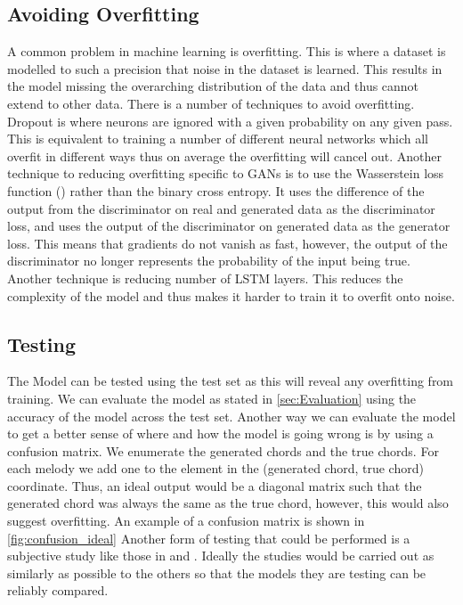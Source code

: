 \subsection{Avoiding Overfitting}
A common problem in machine learning is overfitting. This is where a dataset is modelled to such a precision that noise in the dataset is learned.
This results in the model missing the overarching distribution of the data and thus cannot extend to other data.
There is a number of techniques to avoid overfitting.
Dropout is where neurons are ignored with a given probability on any given pass. 
This is equivalent to training a number of different neural networks which all overfit in different ways thus on average the overfitting will cancel out.
Another technique to reducing overfitting specific to GANs is to use the Wasserstein loss function (\cite{Wasserstein}) rather than the binary cross entropy. 
It uses the difference of the output from the discriminator on real and generated data as the discriminator loss, and uses the output of the discriminator on generated data as the generator loss.
This means that gradients do not vanish as fast, however, the output of the discriminator no longer represents the probability of the input being true.
Another technique is reducing number of LSTM layers. 
This reduces the complexity of the model and thus makes it harder to train it to overfit onto noise.


\subsection{Testing}
The Model can be tested using the test set as this will reveal any overfitting from training. 
We can evaluate the model as stated in \cref{sec:Evaluation} using the accuracy of the model across the test set.
Another way we can evaluate the model to get a better sense of where and how the model is going wrong is by using a confusion matrix.
We enumerate the generated chords and the true chords. 
For each melody we add one to the element in the (generated chord, true chord) coordinate. 
Thus, an ideal output would be a diagonal matrix such that the generated chord was always the same as the true chord, however, this would also suggest overfitting.
An example of a confusion matrix is shown in \cref{fig:confusion_ideal}
Another form of testing that could be performed is a subjective study like those in  and .
Ideally the studies would be carried out as similarly as possible to the others so that the models they are testing can be reliably compared.

